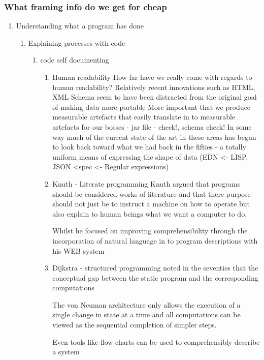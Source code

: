 \documentclass[11pt]{article}
\begin{document}
\subsubsection{What framing info do we get for cheap}
\label{sec:org5dbc7d9}
\begin{enumerate}
\item Understanding what a program has done
\label{sec:org8ee5233}
\begin{enumerate}
\item Explaining processes with code
\label{sec:org1f2a280}
\begin{enumerate}
\item code self documenting
\label{sec:org137b273}
\begin{enumerate}
\item Human readability
\label{sec:org78f5a75}
How far have we really come with regards to human readability?
Relatively recent innovations such as HTML, XML Schema 
seem to have been distracted from the original goal of making data more portable
More important that we produce measurable artefacts that easily translate in to measurable artefacts for our bosses - jar file - check!, schema check!
In some way much of the current state of the art in these areas has begun to look back toward what we had back in the fifties - a totally uniform means of expressing the shape of data 
(EDN <- LISP, JSON <spec <- Regular expressions) 

\item Knuth - Literate programming
\label{sec:orgdc45864}
Knuth argued that programs should be considered works of literature and that there purpose should not just be to instruct a machine on how to operate but also explain to human beings what we want a computer to do.

Whilst he focused on improving comprehensibility through the incorporation of natural language in to program descriptions with his WEB system

\cite{Knuth}
\item Dijkstra - structured programming
\label{sec:orgbf4c5bf}
\cite{Dijkstra} noted in the seventies that the conceptual gap between the static program and the corresponding computations

The von Neuman architecture only allows the execution of a single change in state at a time and all computations can be viewed as the sequential completion of simpler steps.

Even tools like flow charts can be used to comprehensibly describe a system
\end{enumerate}
\end{enumerate}


\end{enumerate}
\end{enumerate}
\end{document}
